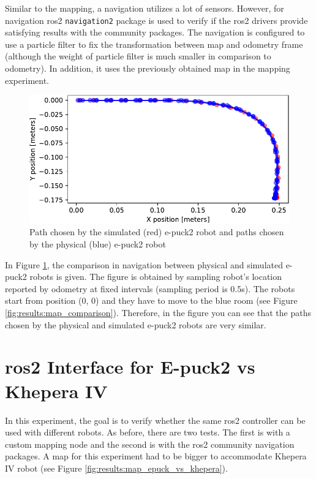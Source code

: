 Similar to the mapping, a navigation utilizes a lot of sensors.
However, for navigation \ac{ros2} \texttt{navigation2} package is used to verify if the \ac{ros2} drivers provide satisfying results with the community packages.
The navigation is configured to use a particle filter to fix the transformation between map and odometry frame (although the weight of particle filter is much smaller in comparison to odometry).
In addition, it uses the previously obtained map in the mapping experiment.

\begin{figure}[H]
    \centering
    \includegraphics[width=\textwidth]{./results/figures/navigation_comparison.pdf}
    \caption{Path chosen by the simulated (red) e-puck2 robot and paths chosen by the physical (blue) e-puck2 robot}
    \label{fig:results:navigation_comparison}
\end{figure}

In Figure \ref{fig:results:navigation_comparison}, the comparison in navigation between physical and simulated e-puck2 robots is given.
The figure is obtained by sampling robot's location reported by odometry at fixed intervals (sampling period is 0.5s).
The robots start from position (0, 0) and they have to move to the blue room (see Figure \ref{fig:results:map_comparison}).
Therefore, in the figure you can see that the paths chosen by the physical and simulated e-puck2 robots are very similar.  

\section{\ac{ros2} Interface for E-puck2 vs Khepera IV}

In this experiment, the goal is to verify whether the same \ac{ros2} controller can be used with different robots.
As before, there are two tests.
The first is with a custom mapping node and the second is with the \ac{ros2} community navigation packages.
A map for this experiment had to be bigger to accommodate Khepera IV robot (see Figure \ref{fig:results:map_epuck_vs_khepera}).

